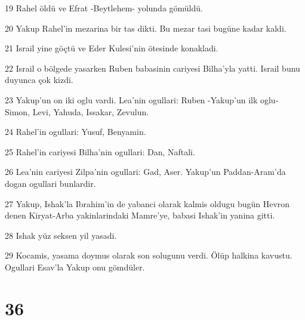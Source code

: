 \par 19 Rahel öldü ve Efrat -Beytlehem- yolunda gömüldü.
\par 20 Yakup Rahel'in mezarina bir tas dikti. Bu mezar tasi bugüne kadar kaldi.
\par 21 Israil yine göçtü ve Eder Kulesi'nin ötesinde konakladi.
\par 22 Israil o bölgede yasarken Ruben babasinin cariyesi Bilha'yla yatti. Israil bunu duyunca çok kizdi.
\par 23 Yakup'un on iki oglu vardi. Lea'nin ogullari: Ruben -Yakup'un ilk oglu- Simon, Levi, Yahuda, Issakar, Zevulun.
\par 24 Rahel'in ogullari: Yusuf, Benyamin.
\par 25 Rahel'in cariyesi Bilha'nin ogullari: Dan, Naftali.
\par 26 Lea'nin cariyesi Zilpa'nin ogullari: Gad, Aser. Yakup'un Paddan-Aram'da dogan ogullari bunlardir.
\par 27 Yakup, Ishak'la Ibrahim'in de yabanci olarak kalmis oldugu bugün Hevron denen Kiryat-Arba yakinlarindaki Mamre'ye, babasi Ishak'in yanina gitti.
\par 28 Ishak yüz seksen yil yasadi.
\par 29 Kocamis, yasama doymus olarak son solugunu verdi. Ölüp halkina kavustu. Ogullari Esav'la Yakup onu gömdüler.

\chapter{36}

